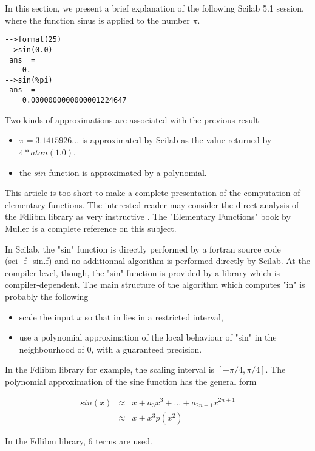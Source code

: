In this section, we present a brief explanation of the following 
Scilab 5.1 session, where the function sinus is applied to the 
number $\pi$.

\begin{verbatim}
-->format(25)
-->sin(0.0)
 ans  =
    0.  
-->sin(%pi)
 ans  =
    0.0000000000000001224647  
\end{verbatim}

Two kinds of approximations are associated with the previous 
result
\begin{itemize}
\item $\pi=3.1415926...$ is approximated by Scilab 
as the value returned by $4*atan(1.0)$,
\item the $sin$ function is approximated by a polynomial.
\end{itemize}

This article is too short to make a complete presentation 
of the computation of elementary functions. The interested 
reader may consider the direct analysis of the Fdlibm library
as very instructive \cite{fdlibm}.
The "Elementary Functions" book by Muller \cite{261217}
is a complete reference on this subject.

In Scilab, the "sin" function is directly performed by a 
fortran source code (sci\_f\_sin.f) and no additionnal 
algorithm is performed directly by Scilab.
At the compiler level, though, the "sin" function is 
provided by a library which is compiler-dependent. 
The main structure of the algorithm which computes 
"in" is probably the following 

\begin{itemize}
\item scale the input $x$ so that in lies in a restricted
interval, 
\item use a polynomial approximation of the local 
behaviour of "sin" in the neighbourhood of 0, with a guaranteed
precision.
\end{itemize}

In the Fdlibm library for example, the scaling interval is 
$[-\pi/4,\pi/4]$. 
The polynomial approximation of the sine function has the general form

\begin{eqnarray}
sin(x) &\approx& x + a_3x^3 + \ldots + a_{2n+1} x^{2n+1}\\
&\approx & x + x^3 p(x^2)
\end{eqnarray}

In the Fdlibm library, 6 terms are used.

